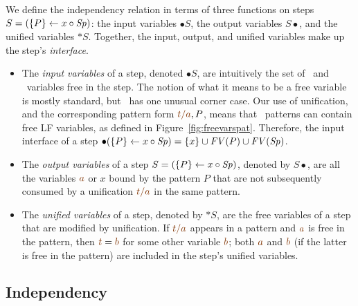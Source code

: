 We define the independency relation in terms of three functions on
steps $S = (\{{P}\} \leftarrow {x} \circ {{\it Sp}})$: the input variables ${\bullet}S$,
the output variables $S{\bullet}$, and the unified variables
${\ast}S$. Together, the input, output, and unified variables make
up the step's {\it interface}. 

\smallskip
\begin{itemize}
\item The {\it input variables} of a step, denoted ${\bullet}S$, are
  intuitively the set of \lf~and \sls~variables free in the step. The
  notion of what it means to be a free variable is mostly standard,
  but \sls~has one unusual corner case. Our use of unification, and
  the corresponding pattern form $\lf{t/a}, P$, means that
  \sls~patterns can contain free LF variables, as defined in
  Figure~\ref{fig:freevarspat}.  Therefore, the input interface of a
  step ${\bullet}(\{{P}\} \leftarrow {x} \circ {{\it Sp}}) = \{ x \} \cup {\it FV}(P) \cup
  {\it FV}({\it Sp})$.


\item The {\it output variables} of a step $S = (\{{P}\} \leftarrow {x} \circ {{\it Sp}})$,
  denoted by $S{\bullet}$, are all the variables $\lf{a}$ or $x$ bound
  by the pattern $P$ that are not subsequently consumed by a
  unification $\lf{t/a}$ in the same pattern.

\item The {\it unified variables} of a step, denoted by ${\ast}S$, are
  the free variables of a step that are modified by unification. If
  $\lf{t/a}$ appears in a pattern and $\lf{a}$ is free in the pattern,
  then $\lf{t} = \lf{b}$ for some other variable $\lf{b}$; both
  $\lf{a}$ and $\lf{b}$ (if the latter is free in the pattern) are
  included in the step's unified variables.
\end{itemize}
\smallskip

\subsection{Independency}

